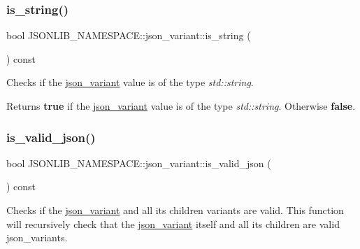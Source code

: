 \subsubsection{\texorpdfstring{is\+\_\+string()}{is\_string()}}
{\footnotesize\ttfamily bool J\+S\+O\+N\+L\+I\+B\+\_\+\+N\+A\+M\+E\+S\+P\+A\+C\+E\+::json\+\_\+variant\+::is\+\_\+string (\begin{DoxyParamCaption}{ }\end{DoxyParamCaption}) const}



Checks if the \hyperlink{classJSONLIB__NAMESPACE_1_1json__variant}{json\+\_\+variant} value is of the type {\itshape std\+::string}. 

\begin{DoxyReturn}{Returns}
{\bfseries true} if the \hyperlink{classJSONLIB__NAMESPACE_1_1json__variant}{json\+\_\+variant} value is of the type {\itshape std\+::string}. Otherwise {\bfseries false}. 
\end{DoxyReturn}
\mbox{\label{classJSONLIB__NAMESPACE_1_1json__variant_a158e3148d9256af3d1b8251b2ca7b6c4}} 
\subsubsection{\texorpdfstring{is\+\_\+valid\+\_\+json()}{is\_valid\_json()}}
{\footnotesize\ttfamily bool J\+S\+O\+N\+L\+I\+B\+\_\+\+N\+A\+M\+E\+S\+P\+A\+C\+E\+::json\+\_\+variant\+::is\+\_\+valid\+\_\+json (\begin{DoxyParamCaption}{ }\end{DoxyParamCaption}) const}



Checks if the \hyperlink{classJSONLIB__NAMESPACE_1_1json__variant}{json\+\_\+variant} and all its children variants are valid. This function will recursively check that the \hyperlink{classJSONLIB__NAMESPACE_1_1json__variant}{json\+\_\+variant} itself and all its children are valid json\+\_\+variants. 

